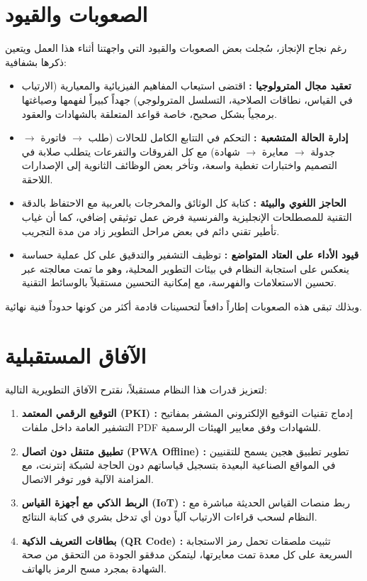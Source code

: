 \documentclass{bts-report-ar}
\begin{document}
\section*{الصعوبات والقيود}
رغم نجاح الإنجاز، سُجلت بعض الصعوبات والقيود التي واجهتنا أثناء هذا العمل ويتعين ذكرها بشفافية:
\begin{itemize}
  \item \textbf{تعقيد مجال المترولوجيا :} اقتضى استيعاب المفاهيم الفيزيائية والمعيارية (الارتياب في القياس، نطاقات الصلاحية، التسلسل المترولوجي) جهداً كبيراً لفهمها وصياغتها برمجياً بشكل صحيح، خاصة قواعد  المتعلقة بالشهادات والعقود.
  \item \textbf{إدارة الحالة المتشعبة :} التحكم في التتابع الكامل للحالات (طلب $\rightarrow$ فاتورة $\rightarrow$ جدولة $\rightarrow$ معايرة $\rightarrow$ شهادة) مع كل الفروقات والتفرعات يتطلب صلابة في التصميم واختبارات تغطية واسعة، وتأخر بعض الوظائف الثانوية إلى الإصدارات اللاحقة.
  \item \textbf{الحاجز اللغوي والبيئة :} كتابة كل الوثائق والمخرجات بالعربية مع الاحتفاظ بالدقة التقنية للمصطلحات الإنجليزية والفرنسية فرض عمل توثيقي إضافي، كما أن غياب تأطير تقني دائم في بعض مراحل التطوير زاد من مدة التجريب.
  \item \textbf{قيود الأداء على العتاد المتواضع :} توظيف التشفير والتدقيق على كل عملية حساسة ينعكس على استجابة النظام في بيئات التطوير المحلية، وهو ما تمت معالجته عبر تحسين الاستعلامات والفهرسة، مع إمكانية التحسين مستقبلاً بالوسائط التقنية.
\end{itemize}
وبذلك تبقى هذه الصعوبات إطاراً دافعاً لتحسينات قادمة أكثر من كونها حدوداً فنية نهائية.

\section*{الآفاق المستقبلية}
لتعزيز قدرات هذا النظام مستقبلاً، نقترح الآفاق التطويرية التالية:
\begin{enumerate}
  \item \textbf{التوقيع الرقمي المعتمد (PKI) :} إدماج تقنيات التوقيع الإلكتروني المشفر بمفاتيح التشفير العامة داخل ملفات PDF للشهادات وفق معايير الهيئات الرسمية.
  \item \textbf{تطبيق متنقل دون اتصال (PWA Offline) :} تطوير تطبيق هجين يسمح للتقنيين في المواقع الصناعية البعيدة بتسجيل قياساتهم دون الحاجة لشبكة إنترنت، مع المزامنة الآلية فور توفر الاتصال.
  \item \textbf{الربط الذكي مع أجهزة القياس (IoT) :} ربط منصات القياس الحديثة مباشرة مع النظام لسحب قراءات الارتياب آلياً دون أي تدخل بشري في كتابة النتائج.
  \item \textbf{بطاقات التعريف الذكية (QR Code) :} تثبيت ملصقات تحمل رمز الاستجابة السريعة على كل معدة تمت معايرتها، ليتمكن مدققو الجودة من التحقق من صحة الشهادة بمجرد مسح الرمز بالهاتف.
\end{enumerate}
\end{document}
